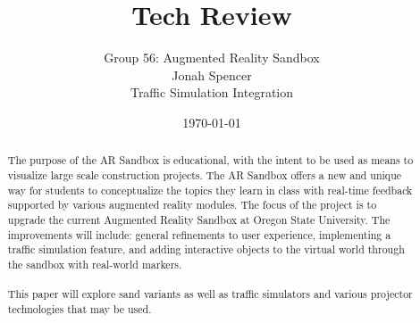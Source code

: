 \documentclass[IEEEtran]{article}
\title{Tech Review}
\author{Group 56: Augmented Reality Sandbox\\Jonah Spencer\\Traffic Simulation Integration}
\date{\today}
\begin{document}
\maketitle

\begin{abstract}
    The purpose of the AR Sandbox is educational, with the intent to be used as means to visualize large scale construction projects. The AR Sandbox offers a new and unique way for students to conceptualize the topics they learn in class with real-time feedback supported by various augmented reality modules. The focus of the project is to upgrade the current Augmented Reality Sandbox at Oregon State University. The improvements will include: general refinements to user experience, implementing a traffic simulation feature, and adding interactive objects to the virtual world through the sandbox with real-world markers.\\ \\
    This paper will explore sand variants as well as traffic simulators and various projector technologies that may be used. 
\end{abstract}

\newpage
\tableofcontents
\clearpage
\newpage
\end{document}
